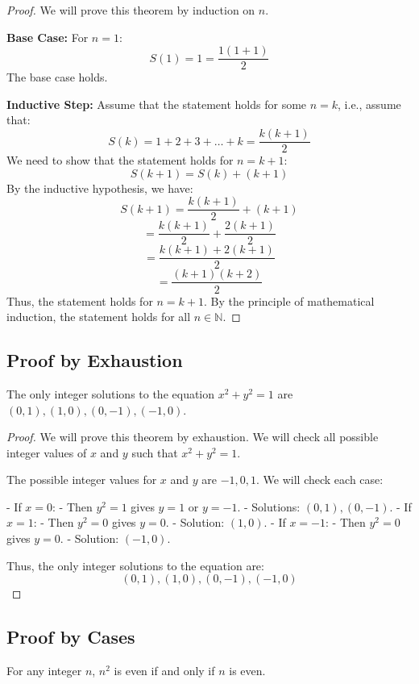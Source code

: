 \begin{proof}
	We will prove this theorem by induction on \( n \).

	\textbf{Base Case:} For \( n = 1 \):
	\[
		S(1) = 1 = \frac{1(1+1)}{2}
	\]
	The base case holds.

	\textbf{Inductive Step:} Assume that the statement holds for some \( n = k \), i.e., assume that:
	\[
		S(k) = 1 + 2 + 3 + \ldots + k = \frac{k(k+1)}{2}
	\]
	We need to show that the statement holds for \( n = k + 1 \):
	\[
		S(k+1) = S(k) + (k + 1)
	\]
	By the inductive hypothesis, we have:
	\[
		S(k+1) = \frac{k(k+1)}{2} + (k + 1)
	\]
	\[
		= \frac{k(k+1)}{2} + \frac{2(k + 1)}{2}
	\]
	\[      = \frac{k(k+1) + 2(k + 1)}{2}
	\]
	\[
		= \frac{(k + 1)(k + 2)}{2}
	\]
	Thus, the statement holds for \( n = k + 1 \).
	By the principle of mathematical induction, the statement holds for all \( n \in \mathbb{N} \).
\end{proof}
\subsection{Proof by Exhaustion}

The only integer solutions to the equation \( x^2 + y^2 = 1 \) are \( (0, 1), (1, 0), (0, -1), (-1, 0) \).

\begin{proof}
	We will prove this theorem by exhaustion. We will check all possible integer values of \( x \) and \( y \) such that \( x^2 + y^2 = 1 \).

	The possible integer values for \( x \) and \( y \) are \( -1, 0, 1 \). We will check each case:

	- If \( x = 0 \):
	- Then \( y^2 = 1 \) gives \( y = 1 \) or \( y = -1 \).
	- Solutions: \( (0, 1), (0, -1) \).
	- If \( x = 1 \):
	- Then \( y^2 = 0 \) gives \( y = 0 \).
	- Solution: \( (1, 0) \).
	- If \( x = -1 \):
	- Then \( y^2 = 0 \) gives \( y = 0 \).
	- Solution: \( (-1, 0) \).

	Thus, the only integer solutions to the equation are:
	\[
		(0, 1), (1, 0), (0, -1), (-1, 0)
	\]
\end{proof}
\subsection{Proof by Cases}

For any integer \( n \), \( n^2 \) is even if and only if \( n \) is even.

